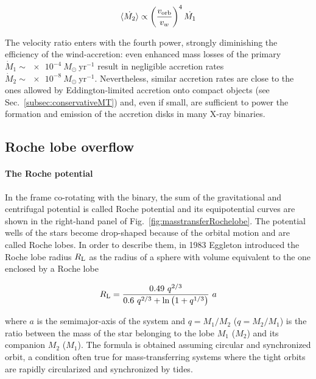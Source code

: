 \documentclass[a4paper,titlepage]{book}     	%
\newcommand{\sun}{\ensuremath{_\odot}}
\newcommand{\mdot}{\ensuremath{\dot{M}}}
\newcommand{\msun}{\ensuremath{M\sun}}
\newcommand{\yr}{\text{yr}}
\newcommand{\rl}{\ensuremath{R_\textup{L}}}
\begin{document}
\begin{equation}\label{eq:windfedaccretion}
\langle \dot{M_2} \rangle \propto \left(\frac{v_\textup{orb}}{v_w}\right)^4 \dot{M_1}
\end{equation}

The velocity ratio enters with the fourth power, strongly diminishing the efficiency of the wind-accretion: even enhanced mass losses of the primary $\mdot_1 \sim \SI{e-4}{\msun~\yr^{-1}}$ result in negligible accretion rates $\mdot_2 \sim \SI{e-8}{\msun~\yr^{-1}}$. Nevertheless, similar accretion rates are close to the ones allowed by Eddington-limited accretion onto compact objects (see Sec.\ \ref{subsec:conservativeMT}) and, even if small, are sufficient to power the formation and emission of the accretion disks in many X-ray binaries.

\subsection{Roche lobe overflow}\label{subsec:Rochelobeoverflow}
\paragraph{The Roche potential}
In the frame co-rotating with the binary, the sum of the gravitational and centrifugal potential is called Roche potential and its equipotential curves are shown in the right-hand panel of Fig.\ \ref{fig:masstransferRochelobe}. The potential wells of the stars become drop-shaped because of the orbital motion and are called Roche lobes. In order to describe them, in 1983 Eggleton \cite{Eggleton1983} introduced the Roche lobe radius $\rl$ as the radius of a sphere with volume equivalent to the one enclosed by a Roche lobe 

\begin{equation}\label{eq:rocheloberadius}
\rl = \frac{0.49~q^{2/3}}{0.6~q^{2/3} + \ln \left(1+q^{1/3}\right)}~a
\end{equation}

where $a$ is the semimajor-axis of the system and $q=M_1/M_2$ ($q=M_2/M_1$) is the ratio between the mass of the star belonging to the lobe $M_1$ ($M_2$) and its companion $M_2$ ($M_1$). The formula is obtained assuming circular and synchronized orbit, a condition often true for mass-transferring systems where the tight orbits are rapidly circularized and synchronized by tides.
\end{document}
